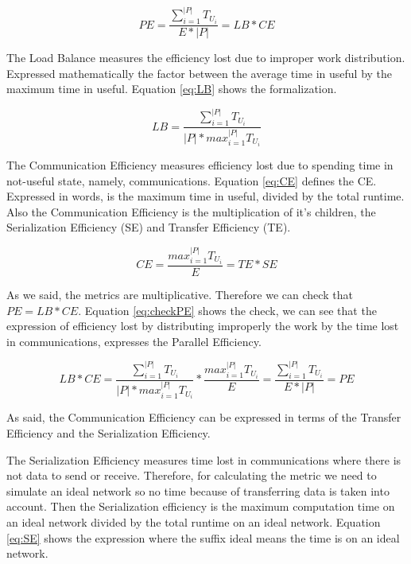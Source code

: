     \begin{equation}\label{eq:PE}
      PE=\frac{\sum_{i=1}^{|P|} T_{U_i}}{E\ast|P|}=LB\ast CE
    \end{equation}

    The Load Balance measures the efficiency lost due to improper work distribution. Expressed mathematically the factor between the average time in useful by the maximum time in useful. Equation \ref{eq:LB} shows the formalization.

    \begin{equation}\label{eq:LB}
      LB=\frac{\sum_{i=1}^{|P|}T_{U_{i}}}{|P|\ast max^{|P|}_{i=1}T_{U_i}}
    \end{equation}

    The Communication Efficiency measures efficiency lost due to spending time in not-useful state, namely, communications. Equation \ref{eq:CE} defines the CE. Expressed in words, is the maximum time in useful, divided by the total runtime. Also the Communication Efficiency is the multiplication of it's children, the Serialization Efficiency (SE) and Transfer Efficiency (TE).

    \begin{equation}\label{eq:CE}
      CE=\frac{max^{|P|}_{i=1} T_{U_i}}{E} = TE \ast SE
    \end{equation}

    As we said, the metrics are multiplicative. Therefore we can check that $PE=LB\ast CE$.
    Equation \ref{eq:checkPE} shows the check, we can see that the expression of efficiency lost by distributing improperly the work by the time lost in communications, expresses the Parallel Efficiency.

    \begin{equation}\label{eq:checkPE}
      LB \ast CE = \frac{\sum_{i=1}^{|P|}T_{U_{i}}}{|P|\ast max^{|P|}_{i=1}T_{U_i}} \ast \frac{max^{|P|}_{i=1} T_{U_i}}{E} = \frac{\sum_{i=1}^{|P|} T_{U_i}}{E\ast|P|} = PE
    \end{equation}

    As said, the Communication Efficiency can be expressed in terms of the Transfer Efficiency and the Serialization Efficiency.
    
    The Serialization Efficiency measures time lost in communications where there is not data to send or receive. Therefore, for calculating the metric we need to simulate an ideal network so no time because of transferring data is taken into account. Then the Serialization efficiency is the maximum computation time on an ideal network divided by the total runtime on an ideal network. Equation \ref{eq:SE} shows the expression where the suffix ideal means the time is on an ideal network.

